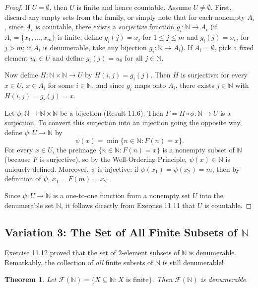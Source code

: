 \documentclass[11pt, letterpaper]{article}
\newtheorem{theorem}{Theorem}[section]
\theoremstyle{definition}
\theoremstyle{remark}
\begin{document}
\begin{proof}
If $U = \emptyset$, then $U$ is finite and hence countable. Assume $U \neq \emptyset$. First, discard any empty sets from the family, or simply note that for each nonempty $A_i$, since $A_i$ is countable, there exists a \emph{surjective} function $g_i : \mathbb{N} \to A_i$ (if $A_i = \{x_1, \dots, x_m\}$ is finite, define $g_i(j) = x_j$ for $1 \le j \le m$ and $g_i(j) = x_m$ for $j > m$; if $A_i$ is denumerable, take any bijection $g_i : \mathbb{N} \to A_i$). If $A_i = \emptyset$, pick a fixed element $u_0 \in U$ and define $g_i(j) = u_0$ for all $j \in \mathbb{N}$.

Now define $H : \mathbb{N} \times \mathbb{N} \to U$ by $H(i, j) = g_i(j)$. Then $H$ is surjective: for every $x \in U$, $x \in A_i$ for some $i \in \mathbb{N}$, and since $g_i$ maps onto $A_i$, there exists $j \in \mathbb{N}$ with $H(i, j) = g_i(j) = x$.

Let $\phi : \mathbb{N} \to \mathbb{N} \times \mathbb{N}$ be a bijection (Result 11.6). Then $F = H \circ \phi : \mathbb{N} \to U$ is a surjection. To convert this surjection into an injection going the opposite way, define $\psi : U \to \mathbb{N}$ by
\[
\psi(x) = \min\{n \in \mathbb{N} : F(n) = x\}.
\]
For every $x \in U$, the preimage $\{n \in \mathbb{N} : F(n) = x\}$ is a nonempty subset of $\mathbb{N}$ (because $F$ is surjective), so by the Well-Ordering Principle, $\psi(x) \in \mathbb{N}$ is uniquely defined. Moreover, $\psi$ is injective: if $\psi(x_1) = \psi(x_2) = m$, then by definition of $\psi$, $x_1 = F(m) = x_2$.

Since $\psi : U \to \mathbb{N}$ is a one-to-one function from a nonempty set $U$ into the denumerable set $\mathbb{N}$, it follows directly from Exercise 11.11 that $U$ is countable.
\end{proof}

\subsection{Variation 3: The Set of All Finite Subsets of $\mathbb{N}$}

Exercise 11.12 proved that the set of $2$-element subsets of $\mathbb{N}$ is denumerable. Remarkably, the collection of \emph{all} finite subsets of $\mathbb{N}$ is still denumerable!

\begin{theorem}
Let $\mathcal{F}(\mathbb{N}) = \{X \subseteq \mathbb{N} : X \text{ is finite}\}$. Then $\mathcal{F}(\mathbb{N})$ is denumerable.
\end{theorem}
\end{document}
